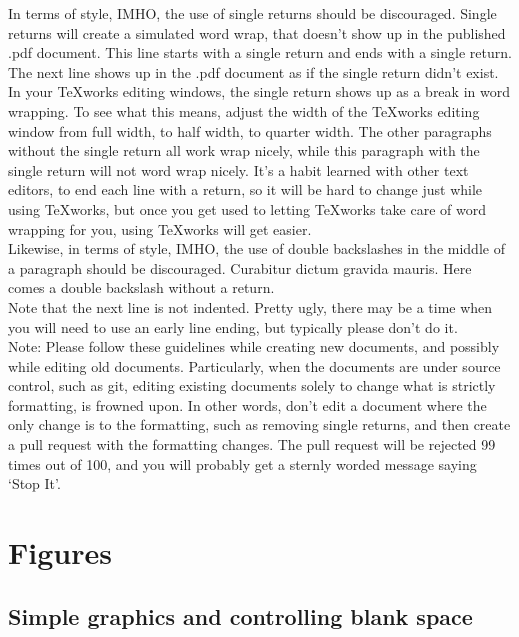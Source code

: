 In terms of style, IMHO, the use of single returns should be discouraged.  Single returns will create a simulated word wrap, that doesn't show up in the published .pdf document.
This line starts with a single return and ends with a single return.
The next line shows up in the .pdf document as if the single return didn't exist.  In your TeXworks editing windows, the single return shows up as a break in word wrapping.  To see what this means, adjust the width of the TeXworks editing window from full width, to half width, to quarter width.  The other paragraphs without the single return all work wrap nicely, while this paragraph with the single return will not word wrap nicely.  It's a habit learned with other text editors, to end each line with a return, so it will be hard to change just while using TeXworks, but once you get used to letting TeXworks take care of word wrapping for you, using TeXworks will get easier.\\

Likewise, in terms of style, IMHO, the use of double backslashes in the middle of a paragraph should be discouraged. Curabitur dictum gravida mauris.  Here comes a double backslash without a return.\\ Note that the next line is not indented.  Pretty ugly, there may be a time when you will need to use an early line ending, but typically please don't do it.\\

Note:  Please follow these guidelines while creating new documents, and possibly while editing old documents.  Particularly, when the documents are under source control, such as git, editing existing documents solely to change what is strictly formatting, is frowned upon.  In other words, don't edit a document where the only change is to the formatting, such as removing single returns, and then create a pull request with the formatting changes.  The pull request will be rejected 99 times out of 100, and you will probably get a sternly worded message saying `Stop It'.


\chapter{Figures}

\section{Simple graphics and controlling blank space}

